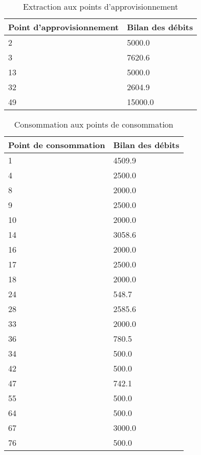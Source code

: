     \begin{table}[h]
      \centering
      \begin{tabular}{|l|l|} \hline
          \textbf{Point d'approvisionnement} & \textbf{Bilan des débits} \\ \hline
          2 & 5000.0 \\ \hline
          3 & 7620.6 \\ \hline
          13 & 5000.0 \\ \hline
          32 & 2604.9 \\ \hline
          49 & 15000.0 \\ \hline
      \end{tabular}
      \caption{Extraction aux points d'approvisionnement}
      \label{c}
    \end{table}
    \begin{table}[h]
      \centering
      \begin{tabular}{|l|l|} \hline
          \textbf{Point de consommation} & \textbf{Bilan des débits} \\ \hline
          1 & 4509.9 \\ \hline
          4 & 2500.0 \\ \hline
          8 & 2000.0 \\ \hline
          9 & 2500.0 \\ \hline
          10 & 2000.0 \\ \hline
          14 & 3058.6 \\ \hline
          16 & 2000.0 \\ \hline
          17 & 2500.0 \\ \hline
          18 & 2000.0 \\ \hline
          24 & 548.7 \\ \hline
          28 & 2585.6 \\ \hline
          33 & 2000.0 \\ \hline
          36 & 780.5 \\ \hline
          34 & 500.0 \\ \hline
          42 & 500.0 \\ \hline
          47 & 742.1 \\ \hline
          55 & 500.0 \\ \hline
          64 & 500.0 \\ \hline
          67 & 3000.0 \\ \hline
          76 & 500.0 \\ \hline
        \end{tabular}
      \caption{Consommation aux points de consommation}
      \label{d}
    \end{table}